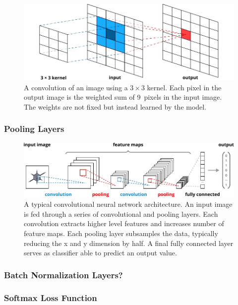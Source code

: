 	\begin{figure}[tp]
  		\centering
    	\includegraphics{img/convolution.pdf}
    	\caption{A convolution of an image using a $3 \times 3$ kernel. Each pixel in the output image is the weighted sum of \num{9}~pixels in the input image. The weights are not fixed but instead learned by the model.}
    	\label{fig:convolution}
	\end{figure}

\subsubsection{Pooling Layers}

	\begin{figure}[tp]
  		\centering
    	\includegraphics{img/convnet.pdf}
    	\caption{A typical convolutional neural network architecture. An input image is fed through a series of convolutional and pooling layers. Each convolution extracts higher level features and increases number of feature maps. Each pooling layer subsamples the data, typically reducing the x and y dimension by half. A final fully connected layer serves as classifier able to predict an output value.}
    	\label{fig:convnet}
	\end{figure}

\subsubsection{Batch Normalization Layers?}
\subsubsection{Softmax Loss Function}
